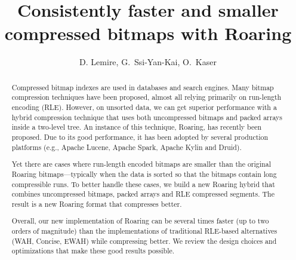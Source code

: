 \documentclass[times]{speauth}
\begin{document}
\newcommand{\Censeighten}{\textsc{Census1881}}
\newcommand{\CensInc}{\textsc{CensusInc}}
\newcommand{\Wikileaks}{\textsc{Wikileaks}}
\newcommand{\Weather}{\textsc{Weather}}
\newcommand{\Censtwothousand}{\textsc{Census2000}}

\newcommand{\Censeightensrt}{\textsc{Census1881}$^{\mathrm{sort}}$}
\newcommand{\CensIncsrt}{\textsc{CensusInc}$^{\mathrm{sort}}$}
\newcommand{\Wikileakssrt}{\textsc{Wikileaks}$^{\mathrm{sort}}$}
\newcommand{\Weathersrt}{\textsc{Weather}$^{\mathrm{sort}}$}
\newcommand{\Censtwothousandsrt}{\textsc{Census2000}$^{\mathrm{sort}}$}
\setlength{\tabcolsep}{3pt}



\title{Consistently faster and smaller compressed bitmaps with Roaring}



\author{D. Lemire, G.~Ssi-Yan-Kai, O.~Kaser}


\address{LICEF Research Center, TELUQ, Montreal, QC, Canada\break
{}42 Quai Georges Gorse, Boulogne-Billancourt, France\break
{}Computer Science and Applied Statistics,
UNB Saint John, Saint John, NB, Canada
}





\begin{abstract}
Compressed bitmap indexes are used in
databases and search engines. 
Many bitmap compression techniques have 
been proposed, almost all relying primarily on run-length encoding (RLE).
However,
on unsorted data, we can get superior performance with a hybrid compression technique that uses both uncompressed bitmaps and packed arrays inside a two-level tree.
An instance of this technique, Roaring, has recently been proposed. Due to its good performance, it has been adopted by several production platforms (e.g., Apache Lucene, Apache Spark, Apache Kylin and Druid).


Yet there are cases where run-length encoded bitmaps are smaller than the original Roaring bitmaps---typically when the data is sorted so that the bitmaps contain long compressible runs.
To better handle these cases, we build a new Roaring hybrid that combines uncompressed bitmaps, packed arrays and RLE compressed segments. The result is a new Roaring format that compresses better.

Overall, our new implementation of Roaring can be several times faster (up to two orders of magnitude) than the implementations of traditional RLE-based alternatives (WAH, Concise, EWAH) while compressing better. We review the design choices and optimizations that make these good results possible.
\end{abstract}
\end{document}

